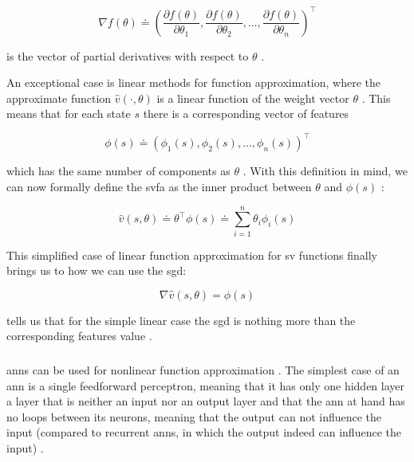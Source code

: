\documentclass[draft=false]{seal_thesis}
\begin{document}
\begin{equation}
	\nabla f(\theta) \doteq \left( \frac{\partial f(\theta)}{\partial \theta_1}, \frac{\partial f(\theta)}{\partial \theta_2}, \ldots, \frac{\partial f(\theta)}{\partial \theta_n} \right)^\top
\end{equation}

is the vector of partial derivatives with respect to $\theta$ \citep[p. 195]{Sutton2017}.

An exceptional case is linear methods for function approximation, where the approximate function $\hat{v} (\cdot ,\theta)$ is a linear function of the weight vector $\theta$ \citep[p. 198]{Sutton2017}. This means that for each state $s$ there is a corresponding vector of features

\begin{equation}
	\phi (s) \doteq \left( \phi_1 (s), \phi_2 (s), \ldots, \phi_n (s) \right)^\top
\end{equation}

which has the same number of components as $\theta$ \citep[p. 198]{Sutton2017}. With this definition in mind, we can now formally define the \gls{svfa} as the inner product between $\theta$ and $\phi (s)$ \citep[p. 198]{Sutton2017}:

\begin{equation}
\label{eq:function_approximation_dot}
	\hat{v} (s,\theta) \doteq \theta^\top \phi (s) \doteq \sum_{i=1}^n \theta_i \phi_i (s)
\end{equation}

This simplified case of linear function approximation for \gls{sv} functions finally brings us to how we can use the \gls{sgd}:

\begin{equation}
\label{eq:sgd_linear}
	\nabla \hat{v} (s,\theta) = \phi (s)
\end{equation}

 tells us that for the simple linear case the \gls{sgd} is nothing more than the corresponding features value  \citep[p. 199]{Sutton2017}.

\subsubsection{}
\label{subsubsec:ann_theory}

\glspl{ann} can be used for nonlinear function approximation \citep[p. 199]{Sutton2017}. The simplest case of an \gls{ann} is a single feedforward perceptron, meaning that it has only one hidden layer \ie a layer that is neither an input nor an output layer and that the \gls{ann} at hand has no loops between its neurons, meaning that the output can not influence the input (compared to recurrent \glspl{ann}, in which the output indeed can influence the input) \citep[p. 216]{Sutton2017}. 
\end{document}
